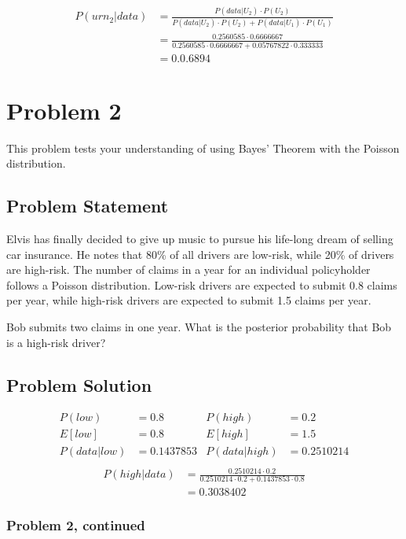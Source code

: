 \documentclass[12pt]{article}
\theoremstyle{definition}
\begin{document}
\begin{align*}
P(urn_2|data) &= \frac{P(data|U_2)\cdot P(U_2)}{P(data|U_2)\cdot P(U_2) + P(data|U_1) \cdot P(U_1)}\\
&= \frac{0.2560585 \cdot 0.6666667}{0.2560585 \cdot 0.6666667 + 0.05767822 \cdot 0.333333}\\
&= 0.0.6894
\end{align*}


\newpage
\section*{Problem 2}

This problem tests your understanding of using Bayes' Theorem with the Poisson distribution.

\subsection*{Problem Statement}

Elvis has finally decided to give up music to pursue his life-long dream of selling car insurance. He notes that 80\% of all drivers are low-risk, while 20\% of drivers are high-risk. The number of claims in a year for an individual policyholder follows a Poisson distribution. Low-risk drivers are expected to submit 0.8 claims per year, while high-risk drivers are expected to submit 1.5 claims per year.

\bigskip
Bob submits two claims in one year. What is the posterior probability that Bob is a high-risk driver?


\subsection*{Problem Solution}
\begin{align*}
P(low) &= 0.8 &P(high) &= 0.2\\
E[low] &= 0.8 &E[high] &= 1.5\\
P(data|low) &= 0.1437853 & P(data|high) &= 0.2510214\\
\end{align*}
\begin{align*}
P(high|data) &= \frac{0.2510214 \cdot 0.2}{0.2510214 \cdot 0.2 + 0.1437853 \cdot 0.8}\\
&= 0.3038402
\end{align*}

\newpage
\subsubsection*{Problem 2, continued}
\end{document}

